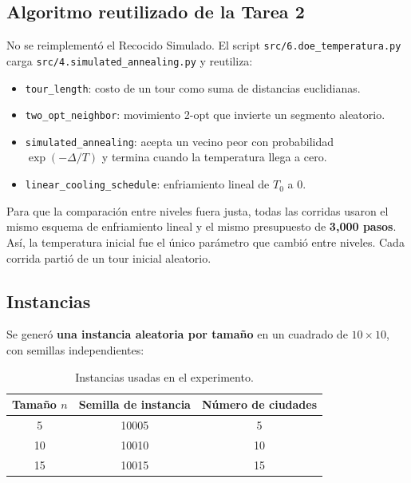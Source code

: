 \documentclass[11pt,letterpaper]{article}
\begin{document}
\subsection{Algoritmo reutilizado de la Tarea 2}

No se reimplementó el Recocido Simulado. El script
\texttt{src/6.doe\_temperatura.py} carga
\texttt{src/4.simulated\_annealing.py} y reutiliza:

\begin{itemize}
  \item \texttt{tour\_length}: costo de un tour como suma de distancias
        euclidianas.
  \item \texttt{two\_opt\_neighbor}: movimiento 2-opt que invierte un segmento
        aleatorio.
  \item \texttt{simulated\_annealing}: acepta un vecino peor con probabilidad
        $\exp(-\Delta/T)$ y termina cuando la temperatura llega a cero.
  \item \texttt{linear\_cooling\_schedule}: enfriamiento lineal de $T_0$ a 0.
\end{itemize}

Para que la comparación entre niveles fuera justa, todas las corridas usaron
el mismo esquema de enfriamiento lineal y el mismo presupuesto de
\textbf{3,000 pasos}. Así, la temperatura inicial fue el único parámetro que
cambió entre niveles. Cada corrida partió de un tour inicial aleatorio.

\subsection{Instancias}

Se generó \textbf{una instancia aleatoria por tamaño} en un cuadrado de
$10 \times 10$, con semillas independientes:

\begin{table}[H]
  \centering
  \caption{Instancias usadas en el experimento.}
  \label{tab:instancias}
  \renewcommand{\arraystretch}{1.15}
  \begin{tabular}{@{}ccc@{}}
    \toprule
    Tamaño $n$ & Semilla de instancia & Número de ciudades \\
    \midrule
    5  & 10005 & 5  \\
    10 & 10010 & 10 \\
    15 & 10015 & 15 \\
    \bottomrule
  \end{tabular}
\end{table}
\end{document}
